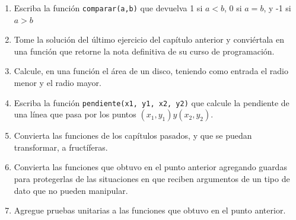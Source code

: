\begin{enumerate}

 \item Escriba la función \verb+comparar(a,b)+ que devuelva 1 si $a<b$, 0 si $a=b$, y -1 si $a>b$
 
 \item Tome la solución del último ejercicio del capítulo anterior y conviértala en una función que retorne la nota 
 definitiva de su curso de programación.
 
 \item Calcule, en una función el área de un disco, teniendo como entrada el radio menor y el radio mayor.
 
 \item Escriba la función \verb+pendiente(x1, y1, x2, y2)+ que calcule la pendiente de una línea que pasa por los puntos 
 $(x_1, y_1) y (x_2, y_2)$. 
 
 \item Convierta las funciones de los capítulos pasados, y que se puedan transformar, a fructíferas.
 
 \item Convierta las funciones que obtuvo en el punto anterior agregando guardas para protegerlas de las situaciones
 en que reciben argumentos de un tipo de dato que no pueden manipular.
 
 \item Agregue pruebas unitarias a las funciones que obtuvo en el punto anterior.
 
\end{enumerate}